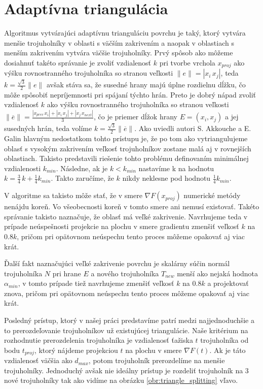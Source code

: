 \section{Adaptívna triangulácia}

Algoritmus vytvárajúci adaptívnu trianguláciu povrchu je taký, ktorý vytvára menšie trojuholníky v oblasti 
s väčším zakrivením a naopak v oblastiach s menším zakrivením vytvára väčšie trojuholníky.
Prvý spôsob ako môžeme dosiahnuť takéto správanie je zvoliť vzdialenosť $k$ pri tvorbe vrchola $x_{proj}$
ako výšku rovnostranného trojuholníka so stranou veľkosti $\|e\| = | x_i \, x_j |$, teda 
$k=\frac{\sqrt 3}{2} \| e \|$ avšak stáva sa, že susedné
hrany majú úplne rozdielnu dĺžku, čo môže spôsobiť nepríjemnosti pri spájaní týchto hrán. 
Preto je dobrý nápad zvoliť vzdialenosť $k$ ako výšku rovnostranného trojuholníka so stranou veľkosti
$\| \overline{e} \| = \frac{| x_{prev} \, x_i | + | x_i \, x_j | + | x_j \, x_{next} |}{3}$, čo je 
priemer dĺžok hrany
$E = (x_i, x_j)$ a jej susedných hrán, teda volíme $k=\frac{\sqrt 3}{2} \| \overline{e} \|$. 
Ako uviedli autori S. Akkouche a E. Galin \cite{akkouche2001adaptive}
hlavným nedostatkom tohto prístupu je, že po tom ako vytriangulujeme oblasť s vysokým zakrivením 
veľkosť trojuholníkov zostane malá aj v rovnejších oblastiach. Takisto predstavili riešenie tohto 
problému definovaním minimálnej vzdialenosti $k_{min}$. Následne, ak je $k < k_{min}$ 
nastavíme k na hodnotu $k = \frac{3}{4} \, k + \frac{1}{4} k_{min}$. Takto zaručíme, že $k$ nikdy neklesne
pod hodnotu $\frac{1}{4} k_{min}$. 

V algoritme sa takisto môže stať, že v smere $\nabla F(x_{proj})$ numerické metódy nenájdu koreň. 
Vo všeobecnosti koreň v tomto smere ani nemusí existovať. Takéto správanie takisto naznačuje, že oblasť
má veľké zakrivenie. Navrhujeme teda v prípade neúspešnosti projekcie na plochu v smere gradientu 
zmenšiť veľkosť $k$ na $0.8 k$, pričom pri opätovnom neúspechu tento proces môžeme opakovať aj viac 
krát. 

Ďalší fakt naznačujúci veľké zakrivenie povrchu je skalárny súčin normál trojuholníka $N$ pri hrane $E$
a nového trojuholníka $T_{new}$ menší ako nejaká hodnota $\alpha_{min}$, v tomto prípade tiež navrhujeme
zmenšiť veľkosť $k$ na $0.8 k$ a projektovať znova, pričom pri opätovnom neúspechu tento proces 
môžeme opakovať aj viac krát.

Posledný prístup, ktorý v našej práci predstavíme patrí medzi najjednoduchšie a to prerozdeľovanie 
trojuholníkov už existujúcej triangulácie. Naše kritérium na rozhodnutie prerozdelenia trojuholníka
je vzdialenosť ťažiska $t$ trojuholníka od bodu $t_{proj}$, ktorý nájdeme projekciou $t$ na plochu
v smere $\nabla F(t)$. Ak je táto vzdialenosť väčšia ako $d_{max}$, potom trojuholník prerozdelíme 
na menšie trojuholníky. Jednoduchý avšak nie ideálny prístup je rozdeliť trojuholník na 3 nové 
trojuholníky tak ako vidíme na obrázku \ref{obr:triangle_splitting} vľavo. 

